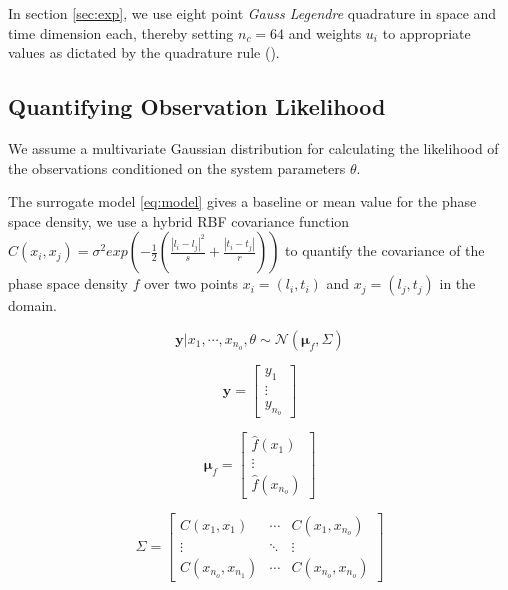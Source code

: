 In section \ref{sec:exp}, we use eight point \emph{Gauss Legendre} quadrature in space and time dimension each, thereby setting $n_c = 64$ and weights $u_i$ to appropriate values as dictated by the quadrature rule (\citet{_abramowitzm}).

\subsection{Quantifying Observation Likelihood}

We assume a multivariate Gaussian distribution for calculating the likelihood of 
the observations conditioned on the system parameters $\theta$. 

The surrogate model \ref{eq:model} gives a baseline or mean value for the phase space density, we use a
hybrid RBF covariance function $C(x_{i}, x_{j}) = \sigma^2 exp(-\frac{1}{2} (\frac{|l_i - l_j|^2}{s} + \frac{|t_i - t_j|}{r}))$
to quantify the covariance of the phase space density $f$ over two points 
$x_i = (l_i, t_i)$ and $x_j = (l_j, t_j)$ in the domain. 

\begin{equation}
\mathbf{y} | x_1, \cdots, x_{n_o}, \theta \sim \mathcal{N} \left(\mathbf{\mu}_f, \Sigma \right )
\end{equation}

\begin{equation}
\mathbf{y} = \begin{bmatrix}
y_1\\ 
\vdots\\ 
y_{n_o}
\end{bmatrix}
\end{equation}

\begin{equation}
  \mathbf{\mu}_f = \begin{bmatrix}
\hat{f}(x_1)\\ 
\vdots\\ 
\hat{f}(x_{n_o})
\end{bmatrix}
\end{equation}

\begin{equation}
    \Sigma = \begin{bmatrix}
C(x_1, x_1) & \cdots  & C(x_1, x_{n_o})\\ 
\vdots & \ddots & \vdots\\ 
C(x_{n_o}, x_{n_{1}}) & \cdots  & C(x_{n_o}, x_{n_{o}})
\end{bmatrix}
\end{equation}

